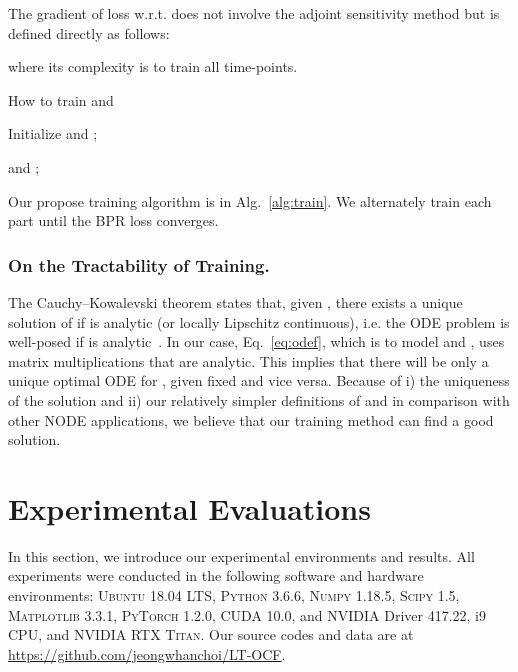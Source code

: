 \documentclass[sigconf]{acmart}
\begin{document}
The gradient of loss w.r.t.  does not involve the adjoint sensitivity method but is defined directly as follows:
\begin{linenomath*}\end{linenomath*}where its complexity is  to train all time-points.


\begin{algorithm}[t]
\SetAlgoLined
\caption{How to train  and }\label{alg:train}
Initialize  and ;

\Return  and ;
\end{algorithm}

Our propose training algorithm is in Alg.~\ref{alg:train}. We alternately train each part until the BPR loss converges.

\subsubsection{On the Tractability of Training.}\label{sec:well}
The Cauchy--Kowalevski theorem states that, given , there exists a unique solution of  if  is analytic (or locally Lipschitz continuous), i.e. the ODE problem is well-posed if  is analytic~\cite{10.2307/j.ctvzsmfgn}. In our case, Eq.~\eqref{eq:odef}, which is to model  and , uses matrix multiplications that are analytic. This implies that there will be only a unique optimal ODE for , given fixed  and vice versa. Because of i) the uniqueness of the solution and ii) our relatively simpler definitions of  and  in comparison with other NODE applications, we believe that our training method can find a good solution.

\section{Experimental Evaluations}
In this section, we introduce our experimental environments and results. All experiments were conducted in the following software and hardware environments: \textsc{Ubuntu} 18.04 LTS, \textsc{Python} 3.6.6, \textsc{Numpy} 1.18.5, \textsc{Scipy} 1.5, \textsc{Matplotlib} 3.3.1, \textsc{PyTorch} 1.2.0, \textsc{CUDA} 10.0, and \textsc{NVIDIA} Driver 417.22, i9 CPU, and \textsc{NVIDIA RTX Titan}. Our source codes and data are at {\color{blue}\url{https://github.com/jeongwhanchoi/LT-OCF}}.
\end{document}
